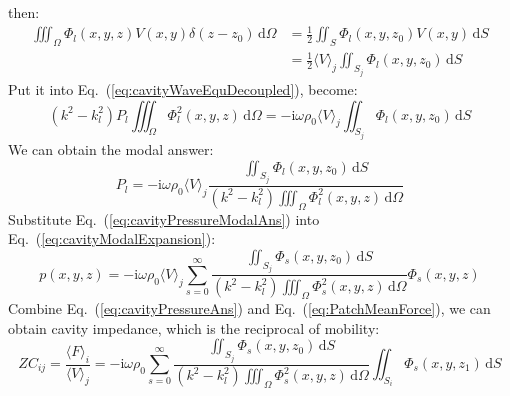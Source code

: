 \documentclass[a4paper,UTF8]{ctexart}
\begin{document}
	then:
	\begin{equation}
	\label{eq:cavityVelocityIntegral}
	\begin{split}
	\iiint_\Omega\Phi_l\left(x,y,z\right)V\left(x,y\right)
		\delta\left(z-z_0\right)\,\mathrm d\Omega
	&= \frac 12\iint_S\Phi_l\left(x,y,z_0\right)V\left(x,y\right)\,\mathrm dS\\
	&= \frac 12 \langle V\rangle_j \iint_{S_j}\Phi_l\left(x,y,z_0\right)\,\mathrm dS
	\end{split}
	\end{equation}
	Put it into Eq.~(\ref{eq:cavityWaveEquDecoupled}), become:
	\begin{equation}
	\label{eq:cavityWaveEquDecoupledSimplify}
	\left(k^2-k_l^2\right)P_l\iiint_\Omega\Phi_l^2\left(x,y,z\right)\,\mathrm d\Omega
	= -\mathrm i\omega\rho_0\langle V\rangle_j\iint_{S_j}\Phi_l\left(x,y,z_0\right)\,\mathrm dS
	\end{equation}
	We can obtain the modal answer:
	\begin{equation}
	\label{eq:cavityPressureModalAns}
	P_l
	= -\mathrm i\omega\rho_0\langle V\rangle_j
		\frac{\iint_{S_j}\Phi_l\left(x,y,z_0\right)\,\mathrm dS}
		{\left(k^2-k_l^2\right)
			\iiint_\Omega\Phi_l^2\left(x,y,z\right)\,\mathrm d\Omega}
	\end{equation}
	Substitute Eq.~(\ref{eq:cavityPressureModalAns}) into Eq.~(\ref{eq:cavityModalExpansion}):
	\begin{equation}
	\label{eq:cavityPressureAns}
	p\left(x,y,z \right) 
	= -\mathrm i\omega\rho_0\langle V\rangle_j\sum_{s=0}^{\infty}
		\frac{\iint_{S_j}\Phi_s\left(x,y,z_0\right)\,\mathrm dS}
		{\left(k^2-k_l^2\right) \iiint_\Omega\Phi_s^2\left(x,y,z\right)\,\mathrm d\Omega}
			\Phi_s\left(x,y,z\right)
	\end{equation}
	Combine Eq.~(\ref{eq:cavityPressureAns}) and Eq.~(\ref{eq:PatchMeanForce}), we can obtain cavity impedance, which is the reciprocal of mobility:
	\begin{equation}
	\label{eq:cavityImpedance}
	ZC_{ij}
	= \frac{\langle F\rangle_i}{\langle V\rangle_j}
	= -\mathrm i\omega\rho_0\sum_{s=0}^{\infty}
		\frac{\iint_{S_j}\Phi_s\left(x,y,z_0\right)\,\mathrm dS}
		{\left(k^2-k_l^2\right) 
			\iiint_\Omega\Phi_s^2\left(x,y,z\right)\,\mathrm d\Omega}
				\iint_{S_i}\Phi_s\left(x,y,z_1\right)\,\mathrm dS
	\end{equation}
	
\end{document}
